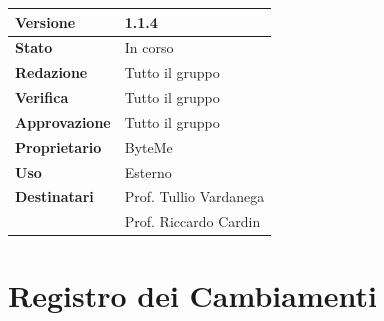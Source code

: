 \documentclass[11pt,a4paper]{article}
\begin{document}
\begin{titlepage}
    \begin{table}[H]
        \centering
        \begin{tabular}{|l|p{5cm}|}
            \hline
            \textbf{Versione} & 1.1.4 \\
            \hline
            \textbf{Stato} & In corso \\
            \hline
            \textbf{Redazione} & Tutto il gruppo \\
            \hline
            \textbf{Verifica} & Tutto il gruppo \\
            \hline
            \textbf{Approvazione} & Tutto il gruppo \\
            \hline
            \textbf{Proprietario} & ByteMe \\
            \hline
            \textbf{Uso} & Esterno \\
            \hline
            \textbf{Destinatari} & Prof. Tullio Vardanega \\ & Prof. Riccardo Cardin \\
            \hline
        \end{tabular}
    \end{table}
    
    \vfill
\end{titlepage}

\thispagestyle{empty}
\section*{Registro dei Cambiamenti}
\end{document}
